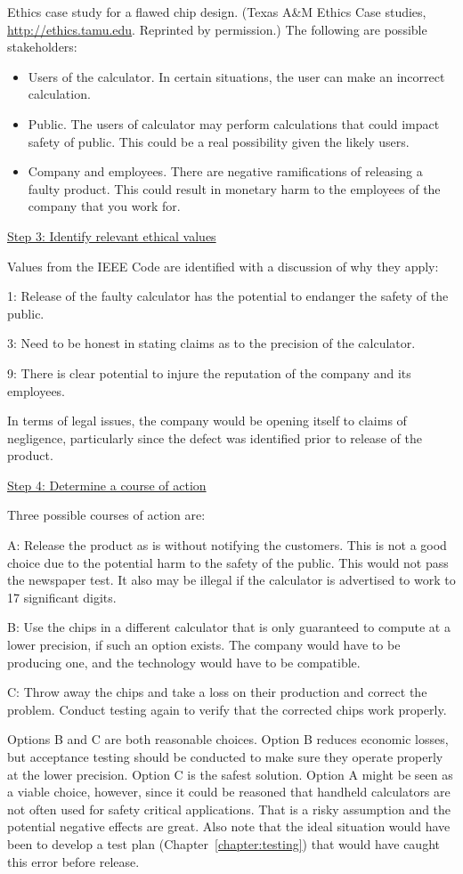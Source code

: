\begin{example}{Ethics case study for a flawed chip design. (Texas
A\&M Ethics Case studies, \url{http://ethics.tamu.edu}. Reprinted by
permission.)  }
The following are possible stakeholders:

\begin{itemize}
\item
  Users of the calculator. In certain situations, the user can make an
  incorrect calculation.
\item
  Public. The users of calculator may perform calculations that could
  impact safety of public. This could be a real possibility given the
  likely users.
\item
  Company and employees. There are negative ramifications of releasing a
  faulty product. This could result in monetary harm to the employees of
  the company that you work for.
\end{itemize}

\ul{Step 3: Identify relevant ethical values}

Values from the IEEE Code are identified with a discussion of why they
apply:

1: Release of the faulty calculator has the potential to endanger the
safety of the public.

3: Need to be honest in stating claims as to the precision of the
calculator.

9: There is clear potential to injure the reputation of the company and
its employees.

In terms of legal issues, the company would be opening itself to claims
of negligence, particularly since the defect was identified prior to
release of the product.

\ul{Step 4: Determine a course of action}

Three possible courses of action are:

A: Release the product as is without notifying the customers. This is
not a good choice due to the potential harm to the safety of the public.
This would not pass the newspaper test. It also may be illegal if the
calculator is advertised to work to 17 significant digits.

B: Use the chips in a different calculator that is only guaranteed to
compute at a lower precision, if such an option exists. The company
would have to be producing one, and the technology would have to be
compatible.

C: Throw away the chips and take a loss on their production and correct
the problem. Conduct testing again to verify that the corrected chips
work properly.

Options B and C are both reasonable choices. Option B reduces economic
losses, but acceptance testing should be conducted to make sure they
operate properly at the lower precision. Option C is the safest
solution. Option A might be seen as a viable choice, however, since it
could be reasoned that handheld calculators are not often used for
safety critical applications. That is a risky assumption and the
potential negative effects are great. Also note that the ideal situation
would have been to develop a test plan (Chapter~\ref{chapter:testing})
 that would have
caught this error before release.


\end{example}
